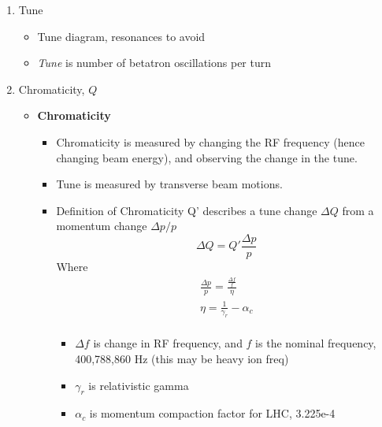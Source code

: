 \begin{itemize}
\begin{enumerate}
        \item Tune
        \begin{itemize}\scriptsize
            \item Tune diagram, resonances to avoid
            \item \emph{Tune} is number of betatron oscillations per turn \cite{pdgAccelSection}
        \end{itemize}
        \item Chromaticity, $Q$
        \begin{itemize}\scriptsize
            \item \textbf{Chromaticity}
            \begin{itemize}\scriptsize
                \item Chromaticity is measured by changing the RF frequency (hence changing beam energy), and observing the change in the tune. \cite{fuchsberger}
                \item Tune is measured by transverse beam motions. \cite{fuchsberger}
                \item Definition of Chromaticity Q' describes a tune change $\Delta Q$ from a momentum change $\Delta p/p$ \cite{fuchsberger}
                \begin{equation}
                    \Delta Q = Q'\frac{\Delta p}{p}
                \end{equation}
                Where
                \begin{equation}
                \begin{split}
                    \frac{\Delta p}{p} = \frac{\frac{\Delta f}{f}}{\eta} \\
                    \eta = \frac{1}{\gamma_r}-\alpha_c \\
                \end{split}
                \end{equation}
                \begin{itemize}\scriptsize
                    \item $\Delta f$ is change in RF frequency, and $f$ is the nominal frequency, 400,788,860 Hz (this may be heavy ion freq)
                    \item $\gamma_r$ is relativistic gamma
                    \item $\alpha_c$ is momentum compaction factor for LHC, 3.225e-4

\end{itemize}
\end{itemize}
\end{itemize}
\end{enumerate}
\end{itemize}
